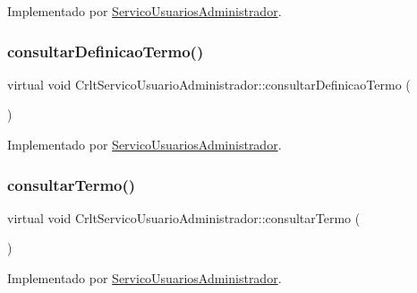 Implementado por \mbox{\hyperlink{class_servico_usuarios_administrador_ae1474bec1c712ba5640c83f4fe666fc4}{Servico\+Usuarios\+Administrador}}.

\mbox{\label{class_crlt_servico_usuario_administrador_a2cddc1d55c76597e69ce39dab1dc1026}} 
\subsubsection{\texorpdfstring{consultar\+Definicao\+Termo()}{consultarDefinicaoTermo()}}
{\footnotesize\ttfamily virtual void Crlt\+Servico\+Usuario\+Administrador\+::consultar\+Definicao\+Termo (\begin{DoxyParamCaption}{ }\end{DoxyParamCaption})\hspace{0.3cm}{\ttfamily [pure virtual]}}



Implementado por \mbox{\hyperlink{class_servico_usuarios_administrador_acc178ea9b5ed289bde27ca853e874962}{Servico\+Usuarios\+Administrador}}.

\mbox{\label{class_crlt_servico_usuario_administrador_a6924f2f9e7b9b80ddc1be753628fe989}} 
\subsubsection{\texorpdfstring{consultar\+Termo()}{consultarTermo()}}
{\footnotesize\ttfamily virtual void Crlt\+Servico\+Usuario\+Administrador\+::consultar\+Termo (\begin{DoxyParamCaption}{ }\end{DoxyParamCaption})\hspace{0.3cm}{\ttfamily [pure virtual]}}



Implementado por \mbox{\hyperlink{class_servico_usuarios_administrador_aec8b05b7c4a2fb318b6be8f6704d68eb}{Servico\+Usuarios\+Administrador}}.

